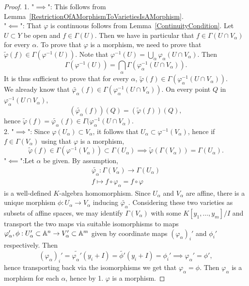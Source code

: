     \begin{proof}
        1. "$\implies$": This follows from Lemma~\ref{RestrictionOfAMorphismToVarietiesIsAMorphism}.\\
        "$\impliedby$": That $\varphi$ is continuous follows from Lemma~\ref{ContinuityCondition}. Let $U \subset Y$ be open and $f\in \Gamma(U)$. Then we have in particular that $f\in \Gamma(U\cap V_\alpha)$ for every $\alpha$. To prove that $\varphi$ is a morphism, we need to prove that $\widetilde{\varphi}(f)\in \Gamma\left(\varphi^{-1}(U)\right)$. Note that $\varphi^{-1}(U)=\bigcup_\alpha \varphi_\alpha(U\cap V_\alpha)$. Then 
        $$\Gamma\left(\varphi^{-1}(U)\right) = \bigcap_\alpha \Gamma\left(\varphi_\alpha^{-1}(U\cap V_\alpha)\right).$$
        It is thus sufficient to prove that for every $\alpha$, $\widetilde{\varphi}(f)\in \Gamma\left(\varphi_\alpha^{-1}(U\cap V_\alpha)\right)$.\\
        We already know that $\widetilde{\varphi_\alpha}(f)\in \Gamma\left(\varphi_\alpha^{-1}(U\cap V_\alpha)\right)$. On every point $Q$ in $\varphi_\alpha^{-1}(U\cap V_\alpha)$, 
        $$\left(\widetilde{\varphi_\alpha}(f)\right)(Q)=\left(\widetilde{\varphi}(f)\right)(Q),$$
        hence $\widetilde{\varphi}(f)=\widetilde{\varphi_\alpha}(f)\in \Gamma(\varphi_\alpha^{-1}(U\cap V_\alpha)$.\\
        2. "$\implies$": Since $\varphi(U_\alpha)\subset V_\alpha$, it follows that $U_\alpha \subset \varphi^{-1}(V_\alpha)$, hence if $f\in \Gamma(V_\alpha)$ using that $\varphi$ is a morphism, 
        $$\widetilde{\varphi}(f)\in \Gamma\left(\varphi^{-1}(V_\alpha)\right) \subset \Gamma(U_\alpha) \implies \widetilde{\varphi}\left(\Gamma(V_\alpha)\right)=\Gamma(U_\alpha).$$
        "$\impliedby$":Let $\alpha$ be given. By assumption, 
        \begin{gather*}
            \widetilde{\varphi_\alpha} : \Gamma(V_\alpha)\rightarrow \Gamma(U_\alpha)\\
            f\mapsto f\circ \varphi_\alpha = f \circ \varphi
        \end{gather*}
        is a well-defined $K$-algebra homomorphism. Since $U_\alpha$ and $V_\alpha$ are affine, there is a unique morphism $\phi: U_\alpha\rightarrow V_\alpha$ inducing $\widetilde{\varphi_\alpha}$. Considering these two varieties as subsets of affine spaces, we may identify $\Gamma(V_\alpha)$ with some $K[y_1,\dots,y_m]/I$ and transport the two maps via suitable isomorphisms to maps $\varphi_\alpha',\phi : U_\alpha'\subset \mathbb{A}^n \rightarrow V_\alpha'\subset \mathbb{A}^m$ given by coordinate maps $(\varphi_\alpha)_i'$ and $\phi_i'$ respectively. Then 
        $$(\varphi_\alpha)_i'=\widetilde{\varphi_\alpha'}(y_i+I)=\widetilde{\phi'}(y_i+I)=\phi_i'\implies \varphi_\alpha'=\phi',$$
        hence transporting back via the isomorphisms we get that $\varphi_\alpha=\phi$. Then $\varphi_\alpha$ is a morphism for each $\alpha$, hence by 1. $\varphi$ is a morphism. 
    \end{proof}
